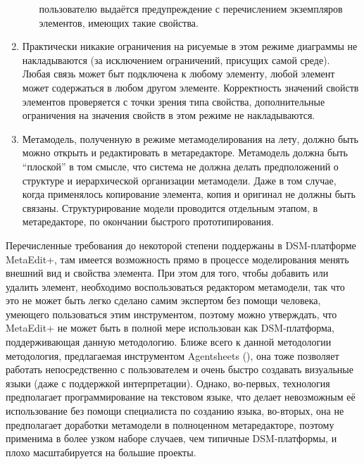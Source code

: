 \begin{enumerate}
\begin{enumerate}
			пользователю выдаётся предупреждение с перечислением экземпляров элементов, имеющих 
			такие свойства.
		\end{enumerate}
	\item Практически никакие ограничения на рисуемые в этом режиме диаграммы не накладываются 
		(за исключением ограничений, присущих самой среде). Любая связь может быт подключена 
		к любому элементу, любой элемент может содержаться в любом другом элементе. Корректность 
		значений свойств элементов проверяется с точки зрения типа свойства, дополнительные 
		ограничения на значения свойств в этом режиме не накладываются.
	\item Метамодель, полученную в режиме метамоделирования на лету, должно быть можно 
		открыть и редактировать в метаредакторе. Метамодель должна быть "`плоской"' в том 
		смысле, что система не должна делать предположений о структуре и иерархической 
		организации метамодели. Даже в том случае, когда применялось копирование элемента, 
		копия и оригинал не должны быть связаны. Структурирование модели проводится отдельным 
		этапом, в метаредакторе, по окончании быстрого прототипирования.
\end{enumerate}

Перечисленные требования до некоторой степени поддержаны в DSM-платформе MetaEdit+,
там имеется возможность прямо в процессе моделирования менять внешний вид и свойства элемента. 
При этом для того, чтобы добавить или удалить элемент, необходимо воспользоваться редактором метамодели, 
так что это не может быть легко сделано самим экспертом без помощи человека, умеющего пользоваться этим 
инструментом, поэтому можно утверждать, что MetaEdit+ не может быть в полной мере использован как 
DSM-платформа, поддерживающая данную методологию. Ближе всего к данной методологии 
методология, предлагаемая инструментом Agentsheets (\cite{repenning1995agentsheets}), 
она тоже позволяет работать непосредственно с пользователем и очень быстро создавать 
визуальные языки (даже с поддержкой интерпретации). Однако, во-первых, технология 
предполагает программирование на текстовом языке, что делает невозможным её использование 
без помощи специалиста по созданию языка, во-вторых, она не предполагает доработки метамодели 
в полноценном метаредакторе, поэтому применима в более узком наборе случаев, чем типичные 
DSM-платформы, и плохо масштабируется на большие проекты.

